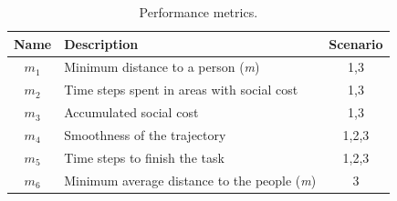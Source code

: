 \begin{table}[h!]
\centering
\begin{tabular}{||c l c||} 
 \hline
 Name & Description & Scenario \\ [0.5ex] 
 \hline\hline
 $m_{1}$ & Minimum distance to a person (\textit{m}) & 1,3 \\ 
 $m_{2}$ & Time steps spent in areas with social cost & 1,3  \\
 $m_{3}$ & Accumulated social cost & 1,3  \\
 $m_{4}$ & Smoothness of the trajectory & 1,2,3  \\
 $m_{5}$ & Time steps to finish the task & 1,2,3  \\
 $m_{6}$ & Minimum average distance to the people (\textit{m}) & 3  \\ [1ex] 
 \hline
\end{tabular}
\caption{Performance metrics.}
\label{table:metrics}
\end{table}


